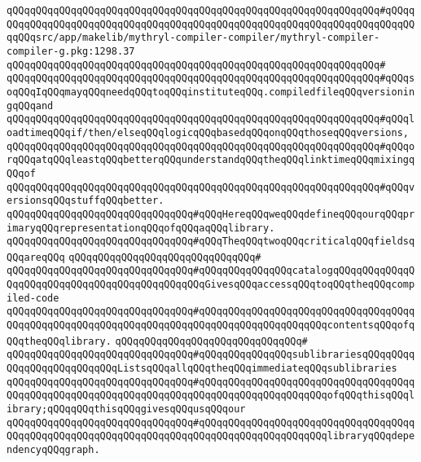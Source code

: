 \verb|qQQqqQQqqQQqqQQqqQQqqQQqqQQqqQQqqQQqqQQqqQQqqQQqqQQqqQQqqQQqqQQq#qQQqqQQqqQQqqQQqqQQqqQQqqQQqqQQqqQQqqQQqqQQqqQQqqQQqqQQqqQQqqQQqqQQqqQQqqQQqqQQqsrc/app/makelib/mythryl-compiler-compiler/mythryl-compiler-compiler-g.pkg:1298.37|\newline
\verb|qQQqqQQqqQQqqQQqqQQqqQQqqQQqqQQqqQQqqQQqqQQqqQQqqQQqqQQqqQQqqQQq#|\newline
\verb|qQQqqQQqqQQqqQQqqQQqqQQqqQQqqQQqqQQqqQQqqQQqqQQqqQQqqQQqqQQqqQQq#qQQqsoqQQqIqQQqmayqQQqneedqQQqtoqQQqinstituteqQQq.compiledfileqQQqversioningqQQqand|\newline
\verb|qQQqqQQqqQQqqQQqqQQqqQQqqQQqqQQqqQQqqQQqqQQqqQQqqQQqqQQqqQQqqQQq#qQQqloadtimeqQQqif/then/elseqQQqlogicqQQqbasedqQQqonqQQqthoseqQQqversions,|\newline
\verb|qQQqqQQqqQQqqQQqqQQqqQQqqQQqqQQqqQQqqQQqqQQqqQQqqQQqqQQqqQQqqQQq#qQQqorqQQqatqQQqleastqQQqbetterqQQqunderstandqQQqtheqQQqlinktimeqQQqmixingqQQqof|\newline
\verb|qQQqqQQqqQQqqQQqqQQqqQQqqQQqqQQqqQQqqQQqqQQqqQQqqQQqqQQqqQQqqQQq#qQQqversionsqQQqstuffqQQqbetter.|\newline
\newline
\newline
\verb|qQQqqQQqqQQqqQQqqQQqqQQqqQQqqQQq#qQQqHereqQQqweqQQqdefineqQQqourqQQqprimaryqQQqrepresentationqQQqofqQQqaqQQqlibrary.|\newline
\verb|qQQqqQQqqQQqqQQqqQQqqQQqqQQqqQQq#qQQqTheqQQqtwoqQQqcriticalqQQqfieldsqQQqareqQQq|\newline
\verb|qQQqqQQqqQQqqQQqqQQqqQQqqQQqqQQq#|\newline
\verb|qQQqqQQqqQQqqQQqqQQqqQQqqQQqqQQq#qQQqqQQqqQQqqQQqcatalogqQQqqQQqqQQqqQQqqQQqqQQqqQQqqQQqqQQqqQQqqQQqqQQqGivesqQQqaccessqQQqtoqQQqtheqQQqcompiled-code|\newline
\verb|qQQqqQQqqQQqqQQqqQQqqQQqqQQqqQQq#qQQqqQQqqQQqqQQqqQQqqQQqqQQqqQQqqQQqqQQqqQQqqQQqqQQqqQQqqQQqqQQqqQQqqQQqqQQqqQQqqQQqqQQqqQQqcontentsqQQqofqQQqtheqQQqlibrary.|\newline
\verb|qQQqqQQqqQQqqQQqqQQqqQQqqQQqqQQq#|\newline
\verb|qQQqqQQqqQQqqQQqqQQqqQQqqQQqqQQq#qQQqqQQqqQQqqQQqsublibrariesqQQqqQQqqQQqqQQqqQQqqQQqqQQqListsqQQqallqQQqtheqQQqimmediateqQQqsublibraries|\newline
\verb|qQQqqQQqqQQqqQQqqQQqqQQqqQQqqQQq#qQQqqQQqqQQqqQQqqQQqqQQqqQQqqQQqqQQqqQQqqQQqqQQqqQQqqQQqqQQqqQQqqQQqqQQqqQQqqQQqqQQqqQQqqQQqofqQQqthisqQQqlibrary;qQQqqQQqthisqQQqgivesqQQqusqQQqour|\newline
\verb|qQQqqQQqqQQqqQQqqQQqqQQqqQQqqQQq#qQQqqQQqqQQqqQQqqQQqqQQqqQQqqQQqqQQqqQQqqQQqqQQqqQQqqQQqqQQqqQQqqQQqqQQqqQQqqQQqqQQqqQQqqQQqlibraryqQQqdependencyqQQqgraph.|\newline
